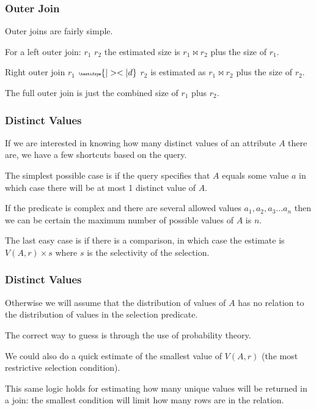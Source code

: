 \begin{frame}
\frametitle{Outer Join}

Outer joins are fairly simple. 

For a left outer join: $r_{1}$ {\tiny {}} $r_{2}$ the estimated size is $r_{1} \bowtie r_{2}$ plus the size of $r_{1}$.

Right outer join $r_{1}$ ${\tiny \textifsym{|><|d}}$ $r_{2}$ is estimated as $r_{1} \bowtie r_{2}$ plus the size of $r_{2}$. 

The full outer join {\tiny {}} is just the combined size of $r_{1}$ plus $r_{2}$.


\end{frame}

\begin{frame}
\frametitle{Distinct Values}

If we are interested in knowing how many distinct values of an attribute $A$ there are, we have a few shortcuts based on the query. 

The simplest possible case is if the query specifies that $A$ equals some value $a$ in which case there will be at most 1 distinct value of $A$. 

If the predicate is complex and there are several allowed values $a_{1}, a_{2}, a_{3}... a_{n}$ then we can be certain the maximum number of possible values of $A$ is $n$. 

The last easy case is if there is a comparison, in which case the estimate is $V(A,r) \times s$ where $s$ is the selectivity of the selection.


\end{frame}


\begin{frame}
\frametitle{Distinct Values}

Otherwise we will assume that the distribution of values of $A$ has no relation to the distribution of values in the selection predicate. 

The correct way to guess is through the use of probability theory. 

We could also do a quick estimate of the smallest value of $V(A, r)$ (the most restrictive selection condition). 

This same logic holds for estimating how many unique values will be returned in a join: the smallest condition will limit how many rows are in the relation.

\end{frame}


